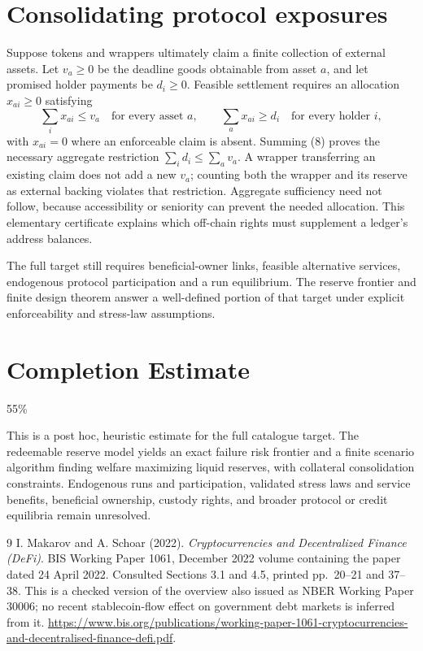 \documentclass[11pt]{article}
\theoremstyle{remark}
\begin{document}
\section{Consolidating protocol exposures}
Suppose tokens and wrappers ultimately claim a finite collection of
external assets. Let $v_a\geq0$ be the deadline goods obtainable from
asset $a$, and let promised holder payments be $d_i\geq0$. Feasible
settlement requires an allocation $x_{ai}\geq0$ satisfying
\[
 \sum_i x_{ai}\leq v_a\quad\text{for every asset }a,
 \qquad \sum_a x_{ai}\geq d_i\quad\text{for every holder }i,        \tag{8}
\]
with $x_{ai}=0$ where an enforceable claim is absent.
Summing (8) proves the necessary aggregate restriction
$\sum_i d_i\leq\sum_a v_a$. A wrapper transferring an existing claim
does not add a new $v_a$; counting both the wrapper and its reserve as
external backing violates that restriction. Aggregate sufficiency need
not follow, because accessibility or seniority can prevent the needed
allocation. This elementary certificate explains which off-chain rights
must supplement a ledger's address balances.

The full target still requires beneficial-owner links, feasible alternative
services, endogenous protocol participation and a run equilibrium. The
reserve frontier and finite design theorem answer a well-defined portion
of that target under explicit enforceability and stress-law assumptions.

\section{Completion Estimate}
55\%

This is a post hoc, heuristic estimate for the full catalogue target.
The redeemable reserve model yields an exact failure risk frontier and a finite scenario algorithm finding welfare maximizing liquid reserves, with collateral consolidation constraints. Endogenous runs and participation, validated stress laws and service benefits, beneficial ownership, custody rights, and broader protocol or credit equilibria remain unresolved.

\begin{thebibliography}{9}
 I. Makarov and A. Schoar (2022).
\emph{Cryptocurrencies and Decentralized Finance (DeFi)}.
BIS Working Paper 1061, December 2022 volume containing the paper dated
24 April 2022. Consulted Sections 3.1 and 4.5, printed pp.~20--21 and
37--38. This is a checked version of the overview also issued as NBER
Working Paper 30006; no recent stablecoin-flow effect on government debt
markets is inferred from it.
\url{https://www.bis.org/publications/working-paper-1061-cryptocurrencies-and-decentralised-finance-defi.pdf}.
\end{thebibliography}
\end{document}

